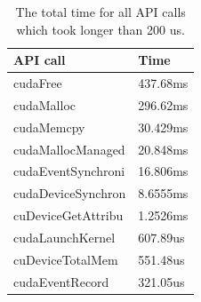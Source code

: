 \documentclass{article} \usepackage[utf8]{inputenc} \usepackage{amsmath}
\begin{document}
\begin{table}[] 
  \centering 
  \begin{tabular}{|l|l|} 
    \hline API call           & Time \\
    \hline cudaFree           & 437.68ms \\
    \hline cudaMalloc         & 296.62ms \\
    \hline cudaMemcpy         & 30.429ms \\
    \hline cudaMallocManaged  & 20.848ms \\
    \hline cudaEventSynchroni & 16.806ms \\
    \hline cudaDeviceSynchron & 8.6555ms \\
    \hline cuDeviceGetAttribu & 1.2526ms \\
    \hline cudaLaunchKernel   & 607.89us \\
    \hline cuDeviceTotalMem   & 551.48us \\
    \hline cudaEventRecord    & 321.05us \\ \hline
  \end{tabular} 
  \caption{The total time for all API calls
  which took longer than 200 us.}
\end{table}
\end{document}
